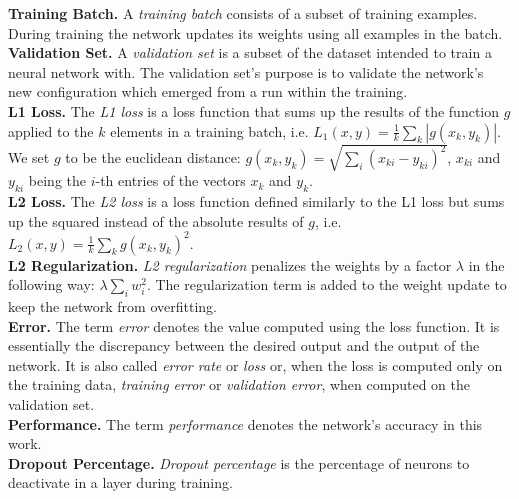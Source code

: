 \noindent\textbf{Training Batch.} A \textit{training batch} consists of a subset of training examples. During training the network updates its weights using all examples in the batch. \\

\noindent\textbf{Validation Set.} A \textit{validation set} is a subset of the dataset intended to train a neural network with. The validation set's purpose is to validate the network's new configuration which emerged from a run within the training. \\

\noindent\textbf{L1 Loss.} The \textit{L1 loss} is a loss function that sums up the results of the function $g$ applied to the $k$ elements in a training batch, i.e. $L_1(x, y) = \frac{1}{k} \sum\limits_k |g(x_k, y_k)|$. We set $g$ to be the euclidean distance: $g(x_k, y_k) = \sqrt{\sum\limits_i (x_{ki} - y_{ki})^2}$, $x_{ki}$ and $y_{ki}$ being the $i$-th entries of the vectors $x_k$ and $y_k$. \\

\noindent\textbf{L2 Loss.} The \textit{L2 loss} is a loss function defined similarly to the L1 loss but sums up the squared instead of the absolute results of $g$, i.e. $L_2(x, y) = \frac{1}{k} \sum\limits_k g(x_k, y_k)^2$. \\

\noindent\textbf{L2 Regularization.} \textit{L2 regularization} penalizes the weights by a factor $\lambda$ in the following way: $\lambda \sum\limits_i w_i^2$. The regularization term is added to the weight update to keep the network from overfitting. \\

\noindent\textbf{Error.} The term \textit{error} denotes the value computed using the loss function. It is essentially the discrepancy between the desired output and the output of the network. It is also called \textit{error rate} or \textit{loss} or, when the loss is computed only on the training data, \textit{training error} or \textit{validation error}, when computed on the validation set. \\

\noindent\textbf{Performance.} The term \textit{performance} denotes the network's accuracy in this work. \\

\noindent\textbf{Dropout Percentage.} \textit{Dropout percentage} is the percentage of neurons to deactivate in a layer during training. \\

